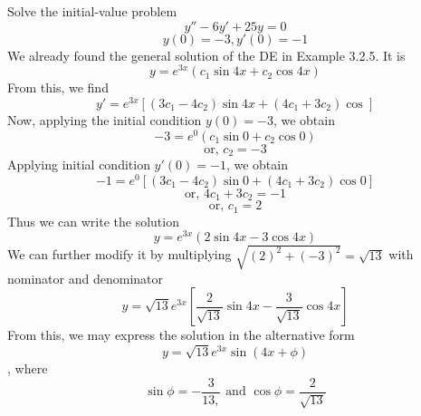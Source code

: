 \begin{example}{Solve the initial-value problem \[
    y'' - 6y' + 25y = 0
\]\[ y(0)=-3, y'(0)=-1 \]}{}
    We already found the general solution of the DE in Example 3.2.5. It is \[
        y = e^{3x}( c_1\sin{4x} + c_2\cos{4x} )
    \] From this, we find \[
        y' = e^{3x} [ (3c_1-4c_2)\sin{4x} + (4c_1+3c_2)\cos{} ]
    \] Now, applying the initial condition $y(0)=-3$, we obtain
    \[ -3 = e^{0}(c_1\sin{0} + c_2\cos{0}) \]
    \[ \text{or, } c_2=-3 \]
    Applying initial condition $y'(0)=-1$, we obtain \[
        -1 = e^{0}[ (3c_1-4c_2)\sin{0} + (4c_1+3c_2)\cos{0} ]
    \]\[ \text{or, } 4c_1 + 3c_2 = -1 \]
    \[ \text{or, } c_1=2 \]
    Thus we can write the solution \[
        y = e^{3x}(2\sin{4x} - 3\cos{4x})
    \] We can further modify it by multiplying $\sqrt{(2)^2 + (-3)^2} = \sqrt{13}$ with nominator and denominator
    \[ y = \sqrt{13}e^{3x} \left[ \frac{2}{\sqrt{13}}\sin{4x} - \frac{3}{\sqrt{13}}\cos{4x} \right] \]
    From this, we may express the solution in the alternative form \[
        y = \sqrt{13}e^{3x}\sin( 4x + \phi )
    \], where \[
        \sin{\phi}=-\frac{3}{13,} \text{ and } \cos{\phi}=\frac{2}{\sqrt{13}}
    \]
\end{example}




























